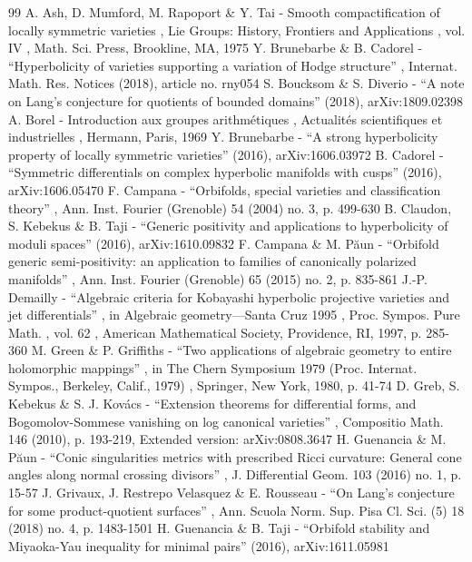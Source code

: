 \begin{thebibliography}{99}
 A. Ash, D. Mumford, M. Rapoport \& Y. Tai - Smooth compactification of locally symmetric varieties , Lie Groups: History, Frontiers and Applications , vol. IV , Math. Sci. Press, Brookline, MA, 1975
 Y. Brunebarbe \& B. Cadorel - “Hyperbolicity of varieties supporting a variation of Hodge structure” , Internat. Math. Res. Notices (2018), article no. rny054
 S. Boucksom \& S. Diverio - “A note on Lang’s conjecture for quotients of bounded domains” (2018), arXiv:1809.02398
 A. Borel - Introduction aux groupes arithmétiques , Actualités scientifiques et industrielles , Hermann, Paris, 1969
 Y. Brunebarbe - “A strong hyperbolicity property of locally symmetric varieties” (2016), arXiv:1606.03972
 B. Cadorel - “Symmetric differentials on complex hyperbolic manifolds with cusps” (2016), arXiv:1606.05470
 F. Campana - “Orbifolds, special varieties and classification theory” , Ann. Inst. Fourier (Grenoble) 54 (2004) no. 3, p. 499-630
 B. Claudon, S. Kebekus \& B. Taji - “Generic positivity and applications to hyperbolicity of moduli spaces” (2016), arXiv:1610.09832
 F. Campana \& M. Păun - “Orbifold generic semi-positivity: an application to families of canonically polarized manifolds” , Ann. Inst. Fourier (Grenoble) 65 (2015) no. 2, p. 835-861
 J.-P. Demailly - “Algebraic criteria for Kobayashi hyperbolic projective varieties and jet differentials” , in Algebraic geometry—Santa Cruz 1995 , Proc. Sympos. Pure Math. , vol. 62 , American Mathematical Society, Providence, RI, 1997, p. 285-360
 M. Green \& P. Griffiths - “Two applications of algebraic geometry to entire holomorphic mappings” , in The Chern Symposium 1979 (Proc. Internat. Sympos., Berkeley, Calif., 1979) , Springer, New York, 1980, p. 41-74
 D. Greb, S. Kebekus \& S. J. Kovács - “Extension theorems for differential forms, and Bogomolov-Sommese vanishing on log canonical varieties” , Compositio Math. 146 (2010), p. 193-219, Extended version: arXiv:0808.3647
 H. Guenancia \& M. Păun - “Conic singularities metrics with prescribed Ricci curvature: General cone angles along normal crossing divisors” , J. Differential Geom. 103 (2016) no. 1, p. 15-57
 J. Grivaux, J. Restrepo Velasquez \& E. Rousseau - “On Lang’s conjecture for some product-quotient surfaces” , Ann. Scuola Norm. Sup. Pisa Cl. Sci. (5) 18 (2018) no. 4, p. 1483-1501
 H. Guenancia \& B. Taji - “Orbifold stability and Miyaoka-Yau inequality for minimal pairs” (2016), arXiv:1611.05981

\end{thebibliography}
